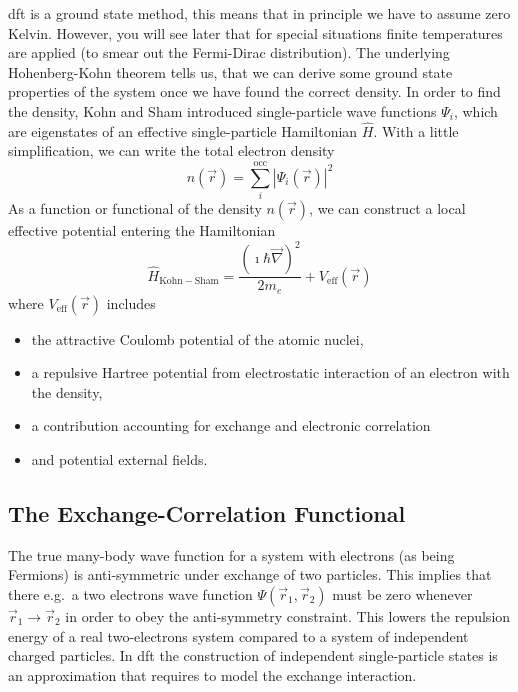 \documentclass[oribibl]{llncs}
\newcommand{\um}[1]{_{\mathrm{#1}}}
\begin{document}
\ac{dft} is a ground state method, this means that in principle we have to
assume zero Kelvin. However, you will see later that for special situations 
finite temperatures are applied (to smear out the Fermi-Dirac distribution).
The underlying Hohenberg-Kohn theorem tells us, that we can derive some 
ground state properties of the system once we have found the correct density.
In order to find the density, Kohn and Sham introduced single-particle wave functions $\Psi_i$, which are eigenstates of an effective single-particle Hamiltonian $\hat H$.
With a little simplification, we can write the total electron density
\begin{equation}
	n(\vec r) = \sum_i^{\mathrm{occ}} \left| \Psi_i(\vec r) \right|^2
	\label{eqn:simplified_density_generation}
\end{equation} 
As a function or functional of the density $n(\vec r)$, we can construct
a local effective potential entering the Hamiltonian
\begin{equation}
	\hat H\um{Kohn-Sham} = \frac{\left( \imath \hbar \vec \nabla \right)^2}{2 m_e} + V\um{eff}(\vec r)
	\label{eqn:Kohn-Sham_Hamiltonian_no_spin}
\end{equation} 
where $V\um{eff}(\vec r)$ includes
\begin{itemize}
  \item the attractive Coulomb potential of the atomic nuclei,
  \item a repulsive Hartree potential from electrostatic 
  		interaction of an electron with the density,
  \item a contribution accounting for exchange and electronic correlation
  \item and potential external fields.
\end{itemize}

\subsection{The Exchange-Correlation Functional}
The true many-body wave function for a system with electrons (as being Fermions)
is anti-symmetric under exchange of two particles. 
This implies that there e.g.~a two electrons wave function $\Psi(\vec r_1,\vec r_2)$ must be zero whenever $\vec r_1 \rightarrow \vec r_2$ in order to obey
the anti-symmetry constraint.
This lowers the repulsion energy of a real two-electrons system compared to a
system of independent charged particles.
In \ac{dft} the construction of independent single-particle states is an approximation that requires to model the exchange interaction.
\end{document}
